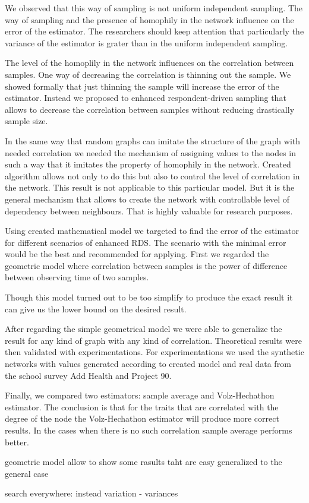\documentclass[12pt]{report}
\newcommand\myworries[1]{\textcolor{red}{#1}}
\renewcommand\myworries[1]{}
\begin{document}
We observed that this way of sampling is not uniform independent sampling. The way of sampling and the presence of homophily in the network influence on the error of the estimator. The researchers should keep attention that particularly the variance of the estimator is grater than in the uniform independent sampling.

The level of the homoplily in the network influences on the correlation between samples. One way of decreasing the correlation is thinning out the sample. We showed formally that just thinning the sample will increase the error of the estimator. Instead we proposed to enhanced respondent-driven sampling that allows to decrease the correlation between samples without reducing drastically sample size.

In the same way that random graphs can imitate the structure of the graph with needed correlation we needed the mechanism of assigning values to the nodes in such a way that it imitates the property of homophily in the network. Created algorithm allows not only to do this but also to control the level of correlation in the network. This result is not applicable to this particular model. But it is the general mechanism that allows to create the network with controllable level of dependency between neighbours. That is highly valuable for research purposes.

Using created mathematical model we targeted to find the error of the estimator for different scenarios of enhanced RDS. The scenario with the minimal error would be the best and recommended for applying. First we regarded the geometric model where correlation between samples is the power of difference between observing time of two samples.

Though this model turned out to be too simplify to produce the exact result it can give us the lower bound on the desired result.

After regarding the simple geometrical model we were able to generalize the result for any kind of graph with any kind of correlation. Theoretical results were then validated with experimentations. For experimentations we used the synthetic networks with values generated according to created model and real data from the school survey Add Health and Project 90.

Finally, we compared two estimators: sample average and Volz-Hechathon estimator. The conclusion is that for the traits that are correlated with the degree of the node the Volz-Hechathon estimator will produce more correct results. In the cases when there is no such correlation sample average performs better.



\myworries{
to correct:
- cautions notes 
- change n on m in the enhanced RDS
- put the transition matrix in the beginning of the second chapter
- everywhere expected energy of random field not configuration!!!
restructure report
appeared - > turned out
}

geometric model allow to show some rasults taht are easy generalized to the general case

search everywhere: instead variation - variances



\end{document}
